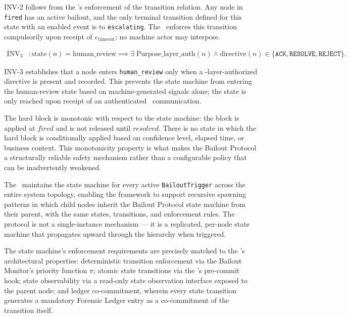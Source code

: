 INV-2 follows from the \fact's enforcement of the transition relation. Any node in \texttt{fired} has an active bailout, and the only terminal transition defined for this state with an enabled event is to \texttt{escalating}. The \fact\ enforces this transition compulsorily upon receipt of $e_{\mathrm{timeout}}$; no machine actor may interpose.

\begin{align}
\mathrm{INV}_3 &: \mathrm{state}(n) = \mathrm{human\_review} \implies \exists\; \mathrm{Purpose\_layer\_auth}(n) \land \mathrm{directive}(n) \in \{\texttt{ACK}, \texttt{RESOLVE}, \texttt{REJECT}\}. \tag{INV-3}
\end{align}

INV-3 establishes that a node enters \texttt{human\_review} only when a \purpose-layer-authorized directive is present and recorded. This prevents the state machine from entering the human-review state based on machine-generated signals alone; the state is only reached upon receipt of an authenticated \purpose\ communication.

The hard block is monotonic with respect to the state machine: the block is applied at $fired$ and is not released until $resolved$. There is no state in which the hard block is conditionally applied based on confidence level, elapsed time, or business context. This monotonicity property is what makes the Bailout Protocol a structurally reliable safety mechanism rather than a configurable policy that can be inadvertently weakened.

The \fact\ maintains the state machine for every active \texttt{BailoutTrigger} across the entire system topology, enabling the framework to support recursive spawning patterns in which child nodes inherit the Bailout Protocol state machine from their parent, with the same states, transitions, and enforcement rules. The protocol is not a single-instance mechanism --- it is a replicated, per-node state machine that propagates upward through the hierarchy when triggered.

The state machine's enforcement requirements are precisely matched to the \fact's architectural properties: deterministic transition enforcement via the Bailout Monitor's priority function $\pi$; atomic state transitions via the \fact's pre-commit hook; state observability via a read-only state observation interface exposed to the parent node; and ledger co-commitment, wherein every state transition generates a mandatory Forensic Ledger entry as a co-commitment of the transition itself.

